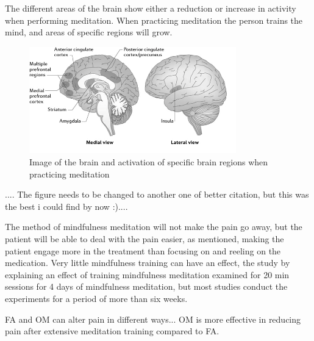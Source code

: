 The different areas of the brain show either a reduction or increase in activity when performing meditation. When practicing meditation the person trains the mind, and areas of specific regions will grow. \cite{Zeidan2012} 

\begin{figure}[H]
	\includegraphics[width=0.8\textwidth,natwidth=610,natheight=642]{figures/brain_meditation.png} 
	\caption{Image of the brain and activation of specific brain regions when practicing meditation}
	\label{fig:brain_meditation}  
\end{figure}   
.... The figure needs to be changed to another one of better citation, but this was the best i could find by now :)....

The method of mindfulness meditation will not make the pain go away, but the patient will be able to deal with the pain easier, as mentioned, making the patient engage more in the treatment than focusing on and reeling on the medication. \cite{Jacob2016}
Very little mindfulness training can have an effect, the study by \cite{Zeidan2012} explaining an effect of training mindfulness meditation examined for 20 min sessions for 4 days of mindfulness meditation, but most studies conduct the experiments for a period of more than six weeks.  \cite{Zeidan2012}

FA and OM can alter pain in different ways...
OM is more effective in reducing pain after extensive meditation training compared to FA. 
\cite{Varilly2012}
                                      


